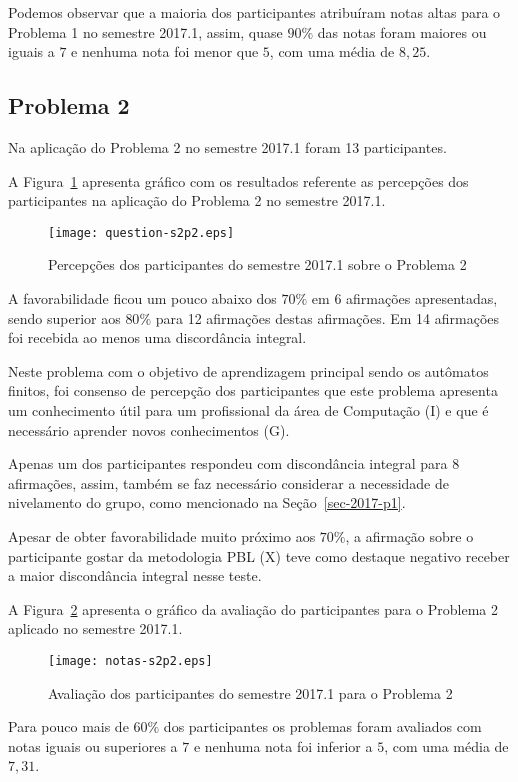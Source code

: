 Podemos observar que a maioria dos participantes atribuíram
notas altas para o Problema 1 no semestre 2017.1, assim, quase $90\%$ das notas
foram maiores ou iguais a $7$ e nenhuma nota foi menor que $5$, com uma média
de $8,25$.

\subsection{Problema 2}
Na aplicação do Problema 2 no semestre 2017.1 foram 13 participantes.

A Figura~\ref{percep-s2p2} apresenta gráfico com os resultados referente
as percepções dos participantes na aplicação do
Problema 2 no semestre 2017.1.

\begin{figure}[!htb]
\centering
\texttt{[image: question-s2p2.eps]}
\caption{Percepções dos participantes do semestre 2017.1 sobre o Problema 2}
\label{percep-s2p2}
\end{figure}

A favorabilidade ficou um pouco abaixo dos $70\%$ em 6 afirmações apresentadas,
sendo superior aos $80\%$ para 12 afirmações destas afirmações.
Em 14 afirmações foi recebida ao menos uma discordância integral.

Neste problema com o objetivo de aprendizagem principal sendo
os autômatos finitos, foi consenso de percepção dos participantes que
este problema apresenta um conhecimento útil para um profissional
da área de Computação (I) e que é necessário aprender novos
conhecimentos (G).

Apenas um dos participantes respondeu com discondância integral para
8 afirmações, assim, também se faz necessário considerar a
necessidade de nivelamento do grupo, como mencionado
na Seção~\ref{sec-2017-p1}.

Apesar de obter favorabilidade muito próximo aos $70\%$, a afirmação
sobre o participante gostar da metodologia PBL (X) teve como
destaque negativo receber a maior discondância integral nesse
teste.

A Figura~\ref{aval-s2p2} apresenta o gráfico da
avaliação do participantes para o Problema 2 aplicado no semestre 2017.1.

\begin{figure}[!htb]
\centering
\texttt{[image: notas-s2p2.eps]}
\caption{Avaliação dos participantes do semestre 2017.1 para o Problema 2}
\label{aval-s2p2}
\end{figure}

Para pouco mais de $60\%$ dos participantes os problemas foram
avaliados com notas iguais ou superiores a $7$ e nenhuma nota
foi inferior a $5$, com uma média de $7,31$.

